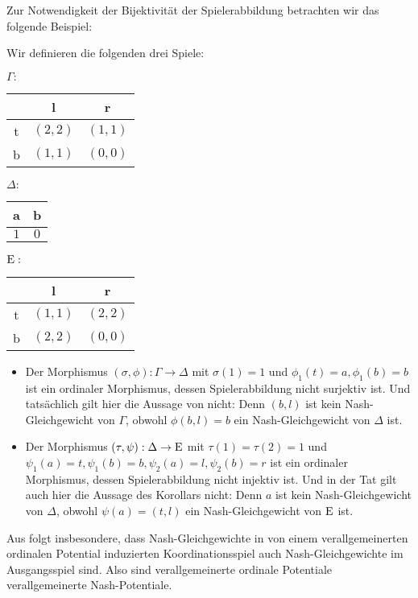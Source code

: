 Zur Notwendigkeit der Bijektivität der Spielerabbildung betrachten wir das folgende Beispiel:

\begin{bsp}
	Wir definieren die folgenden drei Spiele:
	\begin{center}
		$\Gamma:$ \quad
		\begin{tabular}{c||c|c}
				& l 		& r 		\\\hline\hline
			t	& $(2,2)$	& $(1,1)$	\\\hline
			b	& $(1,1)$	& $(0,0)$ 
		\end{tabular}\hspace{3em}
		$\Delta:$ \quad
		\begin{tabular}{c|c}
			a 		& b 		\\\hline\hline
			$1$		& $0$		
		\end{tabular}\hspace{3em}
		$\mathrm{E}:$ \quad
		\begin{tabular}{c||c|c}
				& l 		& r 		\\\hline\hline
			t	& $(1,1)$	& $(2,2)$	\\\hline
			b	& $(2,2)$	& $(0,0)$ 
		\end{tabular}
	\end{center}	

	\begin{itemize}
		\item Der Morphismus $(\sigma, \phi): \Gamma \to \Delta$ mit $\sigma(1) = 1$ und $\phi_1(t) = a, \phi_1(b) = b$ ist ein ordinaler Morphismus, dessen Spielerabbildung nicht surjektiv ist. Und tatsächlich gilt hier die Aussage von  nicht: Denn $(b,l)$ ist kein Nash-Gleichgewicht von $\Gamma$, obwohl $\phi(b,l) = b$ ein Nash-Gleichgewicht von $\Delta$ ist.
		\item Der Morphismus $(\tau, \psi): \Delta \to \mathrm{E}$ mit $\tau(1) = \tau(2) = 1$ und $\psi_1(a) = t, \psi_1(b) = b, \psi_2(a) = l, \psi_2(b) = r$ ist ein ordinaler Morphismus, dessen Spielerabbildung nicht injektiv ist. Und in der Tat gilt auch hier die Aussage des Korollars nicht: Denn $a$ ist kein Nash-Gleichgewicht von $\Delta$, obwohl $\psi(a) = (t,l)$ ein Nash-Gleichgewicht von $\mathrm{E}$ ist.
	\end{itemize}
\end{bsp}

Aus  folgt insbesondere, dass Nash-Gleichgewichte in von einem verallgemeinerten ordinalen Potential induzierten Koordinationsspiel auch Nash-Gleichgewichte im Ausgangsspiel sind. Also sind verallgemeinerte ordinale Potentiale verallgemeinerte Nash-Potentiale.


